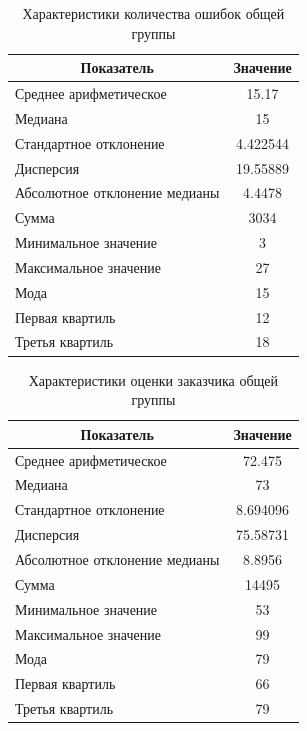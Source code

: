 \begin{table}[H]
	\centering
	\caption{Характеристики количества ошибок общей группы}
	\begin{tabular}{|l|c|}
		\hline
		\multicolumn{1}{|c|}{\textbf{Показатель}} & \textbf{Значение}\\ \hline
		Среднее арифметическое        & 15.17    \\ \hline
		Медиана                       & 15       \\ \hline
		Стандартное отклонение        & 4.422544 \\ \hline
		Дисперсия                      & 19.55889 \\ \hline
		Абсолютное отклонение медианы & 4.4478   \\ \hline
		Сумма                         & 3034     \\ \hline
		Минимальное значение          & 3        \\ \hline
		Максимальное значение         & 27       \\ \hline
		Мода & 15 \\ \hline
		Первая квартиль & 12 \\ \hline
		Третья квартиль & 18 \\ \hline
	\end{tabular}
\end{table}


\begin{table}[H]
	\centering
	\caption{Характеристики оценки заказчика общей группы}
	\begin{tabular}{|l|c|}
		\hline
		\multicolumn{1}{|c|}{\textbf{Показатель}} & \textbf{Значение}\\ \hline
		Среднее арифметическое        & 72.475   \\ \hline
		Медиана                       & 73       \\ \hline
		Стандартное отклонение        & 8.694096 \\ \hline
		Дисперсия                      & 75.58731 \\ \hline
		Абсолютное отклонение медианы & 8.8956   \\ \hline
		Сумма                         & 14495    \\ \hline
		Минимальное значение          & 53       \\ \hline
		Максимальное значение         & 99       \\ \hline
		Мода & 79 \\ \hline
		Первая квартиль & 66 \\ \hline
		Третья квартиль & 79 \\ \hline
	\end{tabular}
\end{table}


